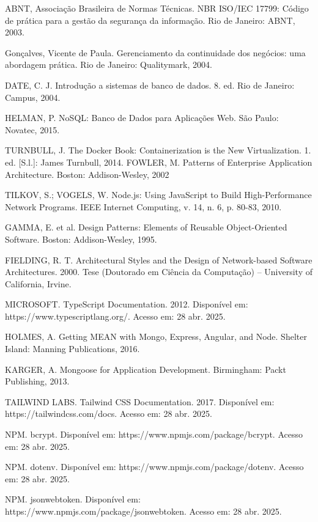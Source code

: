 \documentclass[../main.tex]{subfiles}
\begin{document}
    ABNT, Associação Brasileira de Normas Técnicas. NBR ISO/IEC 17799: Código de prática para a gestão da segurança da informação. Rio de Janeiro: ABNT, 2003.

    Gonçalves, Vicente de Paula. Gerenciamento da continuidade dos negócios: uma abordagem prática. Rio de Janeiro: Qualitymark, 2004.
    
    DATE, C. J. Introdução a sistemas de banco de dados. 8. ed. Rio de Janeiro: Campus, 2004.

    HELMAN, P. NoSQL: Banco de Dados para Aplicações Web. São Paulo: Novatec, 2015.

    TURNBULL, J. The Docker Book: Containerization is the New Virtualization. 1. ed. [S.l.]: James Turnbull, 2014.
    FOWLER, M. Patterns of Enterprise Application Architecture. Boston: Addison-Wesley, 2002

    TILKOV, S.; VOGELS, W. Node.js: Using JavaScript to Build High-Performance Network Programs. IEEE Internet Computing, v. 14, n. 6, p. 80-83, 2010.

    GAMMA, E. et al. Design Patterns: Elements of Reusable Object-Oriented Software. Boston: Addison-Wesley, 1995.

    FIELDING, R. T. Architectural Styles and the Design of Network-based Software Architectures. 2000. Tese (Doutorado em Ciência da Computação) – University of California, Irvine.

    MICROSOFT. TypeScript Documentation. 2012. Disponível em: https://www.typescriptlang.org/. Acesso em: 28 abr. 2025.

    HOLMES, A. Getting MEAN with Mongo, Express, Angular, and Node. Shelter Island: Manning Publications, 2016.

    KARGER, A. Mongoose for Application Development. Birmingham: Packt Publishing, 2013.

    TAILWIND LABS. Tailwind CSS Documentation. 2017. Disponível em: https://tailwindcss.com/docs. Acesso em: 28 abr. 2025.
    
    NPM. bcrypt. Disponível em: https://www.npmjs.com/package/bcrypt. Acesso em: 28 abr. 2025.

    NPM. dotenv. Disponível em: https://www.npmjs.com/package/dotenv. Acesso em: 28 abr. 2025.

    NPM. jsonwebtoken. Disponível em: https://www.npmjs.com/package/jsonwebtoken. Acesso em: 28 abr. 2025.
\end{document}
